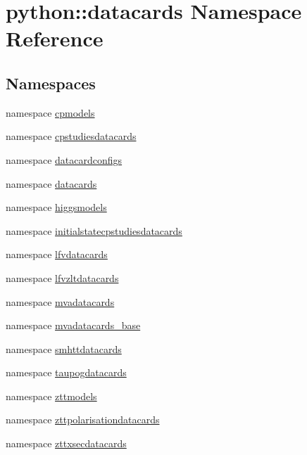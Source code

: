 \hypertarget{namespacepython_1_1datacards}{
\section{python::datacards Namespace Reference}
\label{namespacepython_1_1datacards}
}
\subsection*{Namespaces}
\begin{DoxyCompactItemize}
\item 
namespace \hyperlink{namespacepython_1_1datacards_1_1cpmodels}{cpmodels}
\item 
namespace \hyperlink{namespacepython_1_1datacards_1_1cpstudiesdatacards}{cpstudiesdatacards}
\item 
namespace \hyperlink{namespacepython_1_1datacards_1_1datacardconfigs}{datacardconfigs}
\item 
namespace \hyperlink{namespacepython_1_1datacards_1_1datacards}{datacards}
\item 
namespace \hyperlink{namespacepython_1_1datacards_1_1higgsmodels}{higgsmodels}
\item 
namespace \hyperlink{namespacepython_1_1datacards_1_1initialstatecpstudiesdatacards}{initialstatecpstudiesdatacards}
\item 
namespace \hyperlink{namespacepython_1_1datacards_1_1lfvdatacards}{lfvdatacards}
\item 
namespace \hyperlink{namespacepython_1_1datacards_1_1lfvzltdatacards}{lfvzltdatacards}
\item 
namespace \hyperlink{namespacepython_1_1datacards_1_1mvadatacards}{mvadatacards}
\item 
namespace \hyperlink{namespacepython_1_1datacards_1_1mvadatacards__base}{mvadatacards\_\-base}
\item 
namespace \hyperlink{namespacepython_1_1datacards_1_1smhttdatacards}{smhttdatacards}
\item 
namespace \hyperlink{namespacepython_1_1datacards_1_1taupogdatacards}{taupogdatacards}
\item 
namespace \hyperlink{namespacepython_1_1datacards_1_1zttmodels}{zttmodels}
\item 
namespace \hyperlink{namespacepython_1_1datacards_1_1zttpolarisationdatacards}{zttpolarisationdatacards}
\item 
namespace \hyperlink{namespacepython_1_1datacards_1_1zttxsecdatacards}{zttxsecdatacards}
\end{DoxyCompactItemize}
